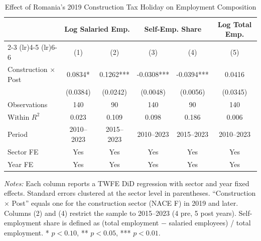 \begin{table}[htbp]
\centering
\caption{Effect of Romania's 2019 Construction Tax Holiday on Employment Composition}
\label{tab:main}
\begin{threeparttable}
\begin{tabular}{lccccc}
\toprule
 & \multicolumn{2}{c}{Log Salaried Emp.} & \multicolumn{2}{c}{Self-Emp. Share} & Log Total Emp. \\
\cmidrule(lr){2-3} \cmidrule(lr){4-5} \cmidrule(lr){6-6}
 & (1) & (2) & (3) & (4) & (5) \\
\midrule
Construction $\times$ Post & 0.0834* & 0.1262*** & -0.0308*** & -0.0394*** & 0.0416 \\
 & (0.0384) & (0.0242) & (0.0048) & (0.0056) & (0.0345) \\
\midrule
Observations & 140 & 90 & 140 & 90 & 140 \\
Within $R^2$ & 0.023 & 0.109 & 0.098 & 0.186 & 0.006 \\
Period & 2010--2023 & 2015--2023 & 2010--2023 & 2015--2023 & 2010--2023 \\
Sector FE & Yes & Yes & Yes & Yes & Yes \\
Year FE & Yes & Yes & Yes & Yes & Yes \\
\bottomrule
\end{tabular}
\begin{tablenotes}[flushleft]
\small
\item \textit{Notes:} Each column reports a TWFE DiD regression with sector and year fixed effects. Standard errors clustered at the sector level in parentheses. ``Construction $\times$ Post'' equals one for the construction sector (NACE F) in 2019 and later. Columns (2) and (4) restrict the sample to 2015--2023 (4 pre, 5 post years). Self-employment share is defined as (total employment $-$ salaried employees) / total employment. * $p < 0.10$, ** $p < 0.05$, *** $p < 0.01$.
\end{tablenotes}
\end{threeparttable}
\end{table}
